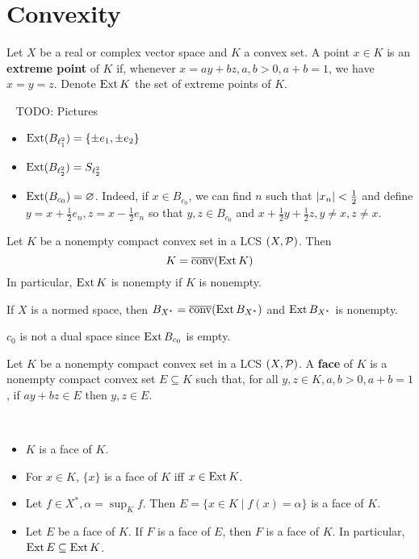 \documentclass{article}
\begin{document}
\clearpage

\section{Convexity}

Let $X$ be a real or complex vector space and $K$ a convex set. A point $x \in K$ is an {\bf extreme point} of $K$ if, whenever $x = ay + bz, a, b > 0, a + b = 1$, we have $x = y = z$. Denote $\operatorname{Ext} K$ the set of extreme points of $K$.

\begin{egs*}~
  TODO: Pictures
  \begin{itemize}
    \item $\operatorname{Ext}(B_{\ell_1^2}) = \{\pm e_1, \pm e_2\}$
    \item $\operatorname{Ext}(B_{\ell_2^2}) = S_{\ell_2^2}$
    \item $\operatorname{Ext}(B_{c_0}) = \varnothing$. Indeed, if $x \in B_{c_0}$, we can find $n$ such that $\left\lvert x_n\right\rvert < \frac 12$ and define $y = x + \frac 12 e_n, z = x - \frac 12 e_n$ so that $y, z \in B_{c_0}$ and $x + \frac 12 y + \frac 12 z, y \ne x, z \ne x$.
  \end{itemize}
\end{egs*}

\begin{thm}\label{thm:krein-milman}
  Let $K$ be a nonempty compact convex set in a LCS $(X, \mathcal P)$. Then
  $$K = \overline{\operatorname{conv}}(\operatorname{Ext} K)$$
  In particular, $\operatorname{Ext} K$ is nonempty if $K$ is nonempty.
\end{thm}

\begin{cor}
  If $X$ is a normed space, then $B_{X^*} = \overline{\operatorname{conv}}(\operatorname{Ext} B_{X^*})$ and $\operatorname{Ext} B_{X^*}$ is nonempty.
\end{cor}

\begin{rmk}
  $c_0$ is not a dual space since $\operatorname{Ext} B_{c_0}$ is empty.
\end{rmk}

\begin{dfn*}
  Let $K$ be a nonempty compact convex set in a LCS $(X, \mathcal P)$. A {\bf face} of $K$ is a nonempty compact convex set $E \subseteq K$ such that, for all $y, z \in K, a, b > 0, a + b = 1$, if $ay + bz \in E$ then $y, z \in E$.
\end{dfn*}

\begin{egs*}~
  \begin{itemize}
    \item $K$ is a face of $K$.
    \item For $x \in K$, $\{x\}$ is a face of $K$ iff $x \in \operatorname{Ext} K$.
    \item Let $f \in X^*, \alpha = \sup_K f$. Then $E = \{x \in K \mid f(x) = \alpha\}$ is a face of $K$.
    \item Let $E$ be a face of $K$. If $F$ is a face of $E$, then $F$ is a face of $K$. In particular, $\operatorname{Ext} E \subseteq \operatorname{Ext} K$.
  \end{itemize}
\end{egs*}
\end{document}
